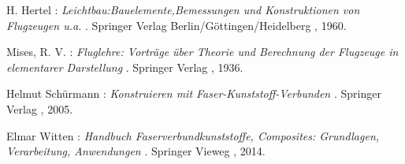 \begin{thebibliography}{99}          
	H. Hertel :
	\textit { Leichtbau:Bauelemente,Bemessungen und Konstruktionen von Flugzeugen u.a. }.
	Springer Verlag Berlin/Göttingen/Heidelberg , 1960.
	
	Mises, R. V. :
	\textit { Fluglehre: Vorträge über Theorie und Berechnung der Flugzeuge in elementarer Darstellung }.
	Springer Verlag , 1936.
	
	Helmut Schürmann :
	\textit { Konstruieren mit Faser-Kunststoff-Verbunden }.
	Springer Verlag , 2005.
	
	Elmar Witten :
	\textit { Handbuch Faserverbundkunststoffe, Composites: Grundlagen, Verarbeitung, Anwendungen }.
	Springer Vieweg , 2014.
	





	
	
\end{thebibliography}